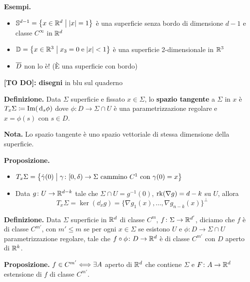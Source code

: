 \newpage

\textbf{Esempi.}
\begin{itemize}

	\item $\mathbb{S}^{d-1} = \left\{ x \in \mathbb R^d \;\middle|\; |x| = 1 \right\}$ è una superficie senza bordo di dimensione $d-1$ e classe $C^\infty$ in $\mathbb R^d$


	\item $\mathbb{D} = \left\{ x \in \mathbb R^3 \;\middle|\; x_3 = 0 \; \text{e} \; |x| < 1 \right\}$ è una superficie 2-dimensionale in $\mathbb R^3$


	\item $\overline{D}$ non lo è! (È una superficie con bordo)

\end{itemize}

\textbf{[TO DO]: disegni} in blu sul quaderno


\textbf{Definizione.} Data $\Sigma$ superficie e fissato $x \in \Sigma$, lo \textbf{spazio tangente} a $\Sigma$ in $x$ è $ T_x \Sigma \coloneqq \operatorname{Im} (\,\mathrm{d}_s \phi)$ dove $\phi \colon D \to \Sigma \cap U$ è una parametrizzazione regolare e $x = \phi(s)$ con $s \in D$.

\textbf{Nota.} Lo spazio tangente è uno spazio vettoriale di stessa dimensione della superficie.

\textbf{Proposizione.} 
\begin{itemize}

	\item $T_x \Sigma = \left\{ \dot \gamma(0) \;\middle|\; \gamma \colon [0,\delta) \to \Sigma \text{ cammino } C^1 \text{ con } \gamma(0) = x \right\}$ 


	\item Data $g \colon U \to \mathbb R^{d-k}$ tale che $\Sigma \cap U = g^{-1}(0)$, $\operatorname{rk}(\nabla g) = d-k$ su $U$, allora 
	$$
		T_x \Sigma = \ker(\dd_x g) = \{\nabla g_1(x),\ldots, \nabla g_{n-k}(x) \}^\perp
	$$
	
\end{itemize}


\textbf{Definizione.} Data $\Sigma$ superficie in $\mathbb R^d$ di classe $C^m$, $f \colon \Sigma \to \mathbb R^{d'}$, diciamo che $f$ è di classe $C^{m'}$, con $m' \leq m$ se per ogni $x \in \Sigma$ se esistono $U$ e $\phi \colon D \to \Sigma \cap U$ parametrizzazione regolare, tale che $f \circ \phi \colon D \to \mathbb R^d$ è di classe $C^{m'}$ con $D$ aperto di $\mathbb R^k$.


\textbf{Proposizione.} $f \in C^{m'} \Longleftrightarrow \exists A$ aperto di $\mathbb R^d$ che contiene $\Sigma$ e $F \colon A \to \mathbb R^d$ estensione di $f$ di classe $C^{m'}$.

